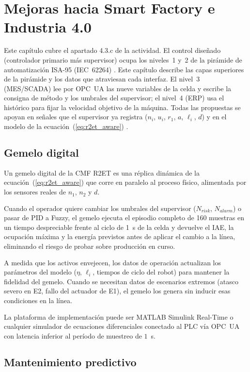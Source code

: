 \chapter{Mejoras hacia Smart Factory e Industria 4.0}
\label{ch:i40}

Este capítulo cubre el apartado 4.3.c de la actividad. El control diseñado (controlador primario más supervisor) ocupa los niveles~1 y~2 de la pirámide de automatización ISA-95 (IEC~62264) \cite{iec62264isa95}. Este capítulo describe las capas superiores de la pirámide y los datos que atraviesan cada interfaz. El nivel~3 (MES/SCADA) lee por OPC~UA las nueve variables de la celda y escribe la consigna de método y los umbrales del supervisor; el nivel~4 (ERP) usa el histórico para fijar la velocidad objetivo de la máquina. Todas las propuestas se apoyan en señales que el supervisor ya registra ($n_i$, $u_i$, $r_1$, $a$, $\ell_i$, $d$) y en el modelo de la ecuación~(\ref{eq:r2et_aware}) \cite{groover2015automation,mccrady2013scada,benitez2022automatizacion}.

\section{Gemelo digital}

Un gemelo digital de la CMF R2ET es una réplica dinámica de la ecuación~(\ref{eq:r2et_aware}) que corre en paralelo al proceso físico, alimentada por los sensores reales de $n_1$, $n_2$ y $d$.

Cuando el operador quiere cambiar los umbrales del supervisor ($N_{risk}$, $N_{alarm}$) o pasar de PID a Fuzzy, el gemelo ejecuta el episodio completo de 160 muestras en un tiempo despreciable frente al ciclo de 1~s de la celda y devuelve el IAE, la ocupación máxima y la energía previstos antes de aplicar el cambio a la línea, eliminando el riesgo de probar sobre producción en curso.

A medida que los activos envejecen, los datos de operación actualizan los parámetros del modelo ($\eta$, $\ell_i$, tiempos de ciclo del robot) para mantener la fidelidad del gemelo. Cuando se necesitan datos de escenarios extremos (atasco severo en E2, fallo del actuador de E1), el gemelo los genera sin inducir esas condiciones en la línea.

La plataforma de implementación puede ser MATLAB Simulink Real-Time o cualquier simulador de ecuaciones diferenciales conectado al PLC vía OPC~UA con latencia inferior al período de muestreo de $1$~s.

\section{Mantenimiento predictivo}

